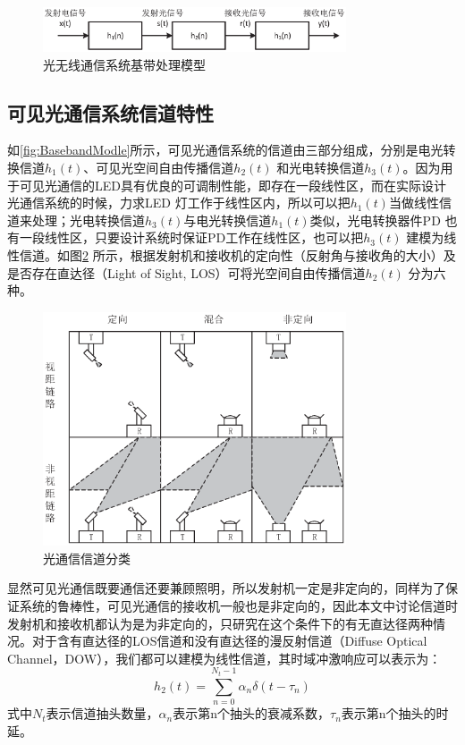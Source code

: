 \begin{figure}[htbp]
\centering
\includegraphics[width=0.8\textwidth]{figures/chapter-2/BasebandModle.eps}
\caption{光无线通信系统基带处理模型}
\label{fig:BasebandModle}
\end{figure}

\subsection{可见光通信系统信道特性}\label{subsection:Channel}
如\autoref{fig:BasebandModle}所示，可见光通信系统的信道由三部分组成，分别是电光转换信道$h_1(t)$、可见光空间自由传播信道$h_2(t)$ 和光电转换信道$h_3(t)$。因为用于可见光通信的LED具有优良的可调制性能，即存在一段线性区，而在实际设计光通信系统的时候，力求LED 灯工作于线性区内，所以可以把$h_1(t)$当做线性信道来处理；光电转换信道$h_3(t)$与电光转换信道$h_1(t)$类似，光电转换器件PD 也有一段线性区，只要设计系统时保证PD工作在线性区，也可以把$h_3(t)$ 建模为线性信道。如图\ref{fig:ChannelClass} 所示，根据发射机和接收机的定向性（反射角与接收角的大小）及是否存在直达径（Light of Sight, LOS）可将光空间自由传播信道$h_2(t)$ 分为六种。
\begin{figure}[htbp]
\centering
\includegraphics[width=0.8\textwidth]{figures/chapter-2/ChannelClass.eps}
\caption{光通信信道分类}
\label{fig:ChannelClass}
\end{figure}
显然可见光通信既要通信还要兼顾照明，所以发射机一定是非定向的，同样为了保证系统的鲁棒性，可见光通信的接收机一般也是非定向的，因此本文中讨论信道时发射机和接收机都认为是为非定向的，只研究在这个条件下的有无直达径两种情况。对于含有直达径的LOS信道和没有直达径的漫反射信道（Diffuse Optical Channel，DOW），我们都可以建模为线性信道，其时域冲激响应可以表示为：
\begin{equation}
\label{equ:opticalChannelMode}
h_2(t) = \sum_{n=0}^{N_t-1}\alpha_n \delta(t-\tau_n)
\end{equation}
式中$N_t$表示信道抽头数量，$\alpha_n$表示第n个抽头的衰减系数，$\tau_n$表示第n个抽头的时延。

